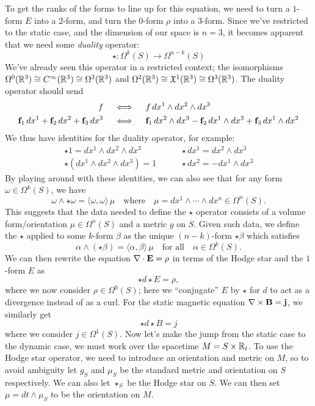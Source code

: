 \documentclass{article}
\begin{document}
To get the ranks of the forms to line up for this equation, we need to turn a $1$-form $E$ into a $2$-form, and turn the $0$-form $\rho$ into a $3$-form. Since we've restricted to the static case, and the dimension of our space is $n=3$, it becomes apparent that we need some \emph{duality} operator:
\[
  \star : \Omega^{k}(S) \to \Omega^{n-k}(S)
\]
We've already seen this operator in a restricted context; the isomorphisms $\Omega^0(\mathbb{R}^3)\cong C^\infty(\mathbb{R}^3) \cong \Omega^3(\mathbb{R}^3)$ and $\Omega^2(\mathbb{R}^3)\cong \mathfrak{X}^1(\mathbb{R}^3) \cong \Omega^3(\mathbb{R}^3)$. The duality operator should send
\[
  \begin{aligned}
    f \quad &\iff\quad f\,dx^1\wedge dx^2\wedge dx^3\\
    \mathbf{f}_{1}\,dx^1 + \mathbf{f}_2\,dx^2+\mathbf{f}_3\,dx^3 \quad&\iff\quad \mathbf{f}_1\, dx^2\wedge dx^3 - \mathbf{f}_2\, dx^1\wedge dx^3 + \mathbf{f}_3\, dx^1\wedge dx^2
  \end{aligned}
\]
We thus have identities for the duality operator, for example: 
\[
  \begin{aligned}
    \star 1 = dx^1\wedge dx^2\wedge dx^3   \quad&\quad \star dx^1 = dx^2\wedge dx^3\\
    \star (dx^1\wedge dx^2\wedge dx^3) = 1 \quad&\quad \star dx^2 = - dx^1\wedge dx^3
  \end{aligned}
\]
By playing around with these identities, we can also see that for any form $\omega\in \Omega^k(S)$, we have
\[
  \omega\wedge \star\omega = \langle \omega, \omega\rangle\, \mu\quad \textrm{where}\quad \mu = dx^1\wedge \cdots\wedge dx^n \in \Omega^n(S).
\]
This suggests that the data needed to define the $\star$ operator consists of a volume form/orientation $\mu\in \Omega^n(S)$ and a metric $g$ on $S$. Given such data, we define the  $\star$ applied to some $k$-form $\beta$ as the unique $(n-k)$-form $\star \beta$ which satisfies 
\[
  \alpha\wedge (\star \beta) = \langle \alpha, \beta \rangle\,\mu \quad\textrm{for all}\quad\alpha\in\Omega^k(S).
\]
We can then rewrite the equation $\nabla\cdot \mathbf{E}=\rho$ in terms of the Hodge star and the $1$-form $E$ as
\[
  \star d\!\star\! E = \rho,
\]
where we now consider $\rho\in \Omega^0(S)$; here we ``conjugate'' $E$ by $\star$ for $d$ to act as a divergence instead of as a curl. For the static magnetic equation $\nabla\times \mathbf{B} = \mathbf{j}$, we similarly get 
\[
  \star d\!\star\! B = j
\]
where we consider $j\in \Omega^1(S)$. Now let's make the jump from the static case to the dynamic case, we must work over the spacetime $M = S\times \mathbb{R}_t$. To use the Hodge star operator, we need to introduce an orientation and metric on $M$, so to avoid ambiguity let $g_S$ and $\mu_S$ be the standard metric and orientation on $S$ respectively. We can also let $\star_S$ be the Hodge star on $S$. We can then set $\mu = dt\wedge \mu_S$ to be the orientation on $M$.
\end{document}
